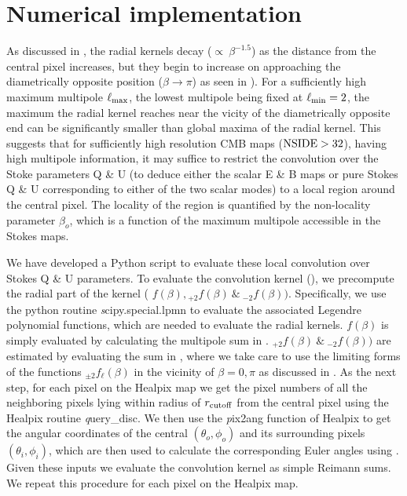 \section{Numerical implementation} \label{sec:numerical_implementation}

As discussed in , the radial kernels decay ($\propto ~ \beta^{-1.5}$) as the distance from the central pixel increases, but they begin to increase on approaching the diametrically opposite position ($\beta \rightarrow \pi$)  as seen in ). For a sufficiently high maximum multipole $\ell_{\rm max}$, the lowest multipole being fixed at $\ell_{\rm min}=2$, the maximum the radial kernel reaches near the vicity of the diametrically opposite end can be significantly smaller than global maxima of the radial kernel. This suggests that for sufficiently high resolution CMB maps (${\rm NSIDE} >32$), having high multipole information, it may suffice to restrict the convolution over the Stoke parameters Q \& U (to deduce either the scalar E \& B maps or pure Stokes Q \& U corresponding to either of the two scalar modes) to a local region around the central pixel. The locality of the region is quantified by the non-locality parameter $\beta_o$, which is a function of the maximum multipole accessible in the Stokes maps.

We have developed a Python script to evaluate these local convolution over Stokes Q \& U parameters. To evaluate the convolution kernel (), we precompute the radial part of the kernel ( $f(\beta), {}_{+2}f(\beta) ~\&~ {}_{-2}f(\beta))$. Specifically, we use the python routine {\textit scipy.special.lpmn} to evaluate the associated Legendre polynomial functions, which are needed to evaluate the radial kernels. $f(\beta)$ is simply evaluated by calculating the multipole sum in . ${}_{+2}f(\beta) ~\&~ {}_{-2}f(\beta))$ are estimated by evaluating the sum in , where we take care to use the limiting forms of the functions ${}_{\pm 2}f_{\ell}(\beta)$ in the vicinity of $\beta=0,\pi$ as discussed in . As the next step, for each pixel on the Healpix map we get the pixel numbers of all the neighboring pixels lying within radius of $r_{\rm cutoff}$ from the central pixel using the Healpix routine {\textit query\_disc}. We then use the {\textit pix2ang} function of Healpix to get the angular coordinates of the central $(\theta_o,\phi_o)$ and its surrounding pixels $(\theta_i,\phi_i)$, which are then used to calculate the corresponding Euler angles using . Given these  inputs we evaluate the convolution kernel as simple Reimann sums. We repeat this procedure for each pixel on the Healpix map. 


